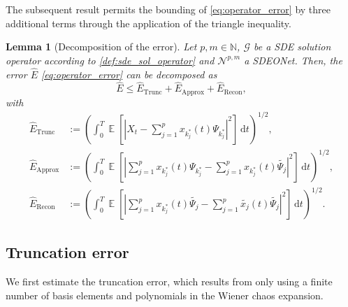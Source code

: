 \documentclass[12pt]{article}
\newtheorem{lemma}[theorem]{Lemma}
\theoremstyle{remark}
\theoremstyle{plain}
\numberwithin{equation}{section}
\newcommand{\dd}{\ensuremath{\,\mathrm d}}
\DeclareMathOperator{\E}{\mathbb E}
\newcommand{\N}{\mathbb{N}}
\newcommand{\charles}[1]{\textcolor{CharlesColor}{#1}}
\begin{document}
The subsequent result permits the bounding of \cref{eq:operator_error} by three additional terms through the application of the triangle inequality.
\begin{lemma}[Decomposition of the error]\label{lemma:decomposition_error}
    Let $p,m \in \N$, $\mathcal G$ be a SDE solution operator according to \cref{def:sde_sol_operator} and $\mathcal N^{p,m}$ a \emph{SDEONet}.
    Then, the error $\hat E$ \cref{eq:operator_error} can be decomposed as
    \begin{equation}
    \label{eq:full_error}
        \hat E \leq \hat E_\text{Trunc} + \hat E_\text{Approx} + \hat E_\text{Recon},
    \end{equation}
    with
    \begin{subequations}
    \begin{align}
        \hat E_\text{Trunc} &:= \left(\int_0^T \E[|X_t - \sum_{j=1}^p x_{k_j^*}(t)\Psi_{k_j^*}|^2]\dd t\right)^{1/2},\label{eq:trunc_error}\\
        \hat E_\text{Approx} &:= \left(\int_0^T \E[|\sum_{j=1}^p x_{k_j^*}(t)\Psi_{k_j^*} - \sum_{j=1}^p x_{k_j^*}(t)\widetilde{\Psi_j}|^2]\dd t\right)^{1/2},\label{eq:approx_error}\\
        \hat E_\text{Recon} &:= \left(\int_0^T \E[|\sum_{j=1}^p x_{k_j^*}(t)\widetilde{\Psi_j} - \sum_{j=1}^p \widetilde{x_j}(t)\widetilde{\Psi_j}|^2]\dd t\right)^{1/2}.\label{eq:reconstruct_error}
    \end{align}
    \end{subequations}
\end{lemma}

\subsection{Truncation error}
\label{sec:truncation}
We first estimate the truncation error, which results from only using a finite number of basis elements and polynomials in the Wiener chaos expansion.
\end{document}

